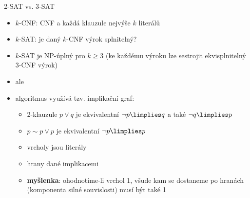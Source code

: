\documentclass{beamer}
\begin{document}
\begin{frame}{2-SAT vs. 3-SAT}

    \begin{itemize}[<+->]
        \item \alert{$k$-CNF}: CNF a každá klauzule nejvýše $k$ literálů
        \item \alert{$k$-SAT}: je daný $k$-CNF výrok splnitelný?
        \item $k$-SAT je NP-úplný pro $k\geq 3$ (ke každému výroku lze sestrojit \alert{ekvisplnitelný} 3-CNF výrok)
        \item ale 
        \item algoritmus využívá tzv. \alert{implikační graf}:         
        \begin{itemize}[<+->]
            \item 2-klauzule $p\lor q$ je ekvivalentní $\neg p\limplies q$ a také $\neg q\limplies p$
            \item $p\sim p\lor p$ je ekvivalentní $\neg p\limplies p$
            \item vrcholy jsou literály
            \item hrany dané implikacemi
            \item \textbf{myšlenka}: ohodnotíme-li vrchol 1, všude kam se dostaneme po hranách (\alert{komponenta} silné souvislosti) musí být také 1
        \end{itemize}        
    \end{itemize}    
    
\end{frame}
\end{document}
